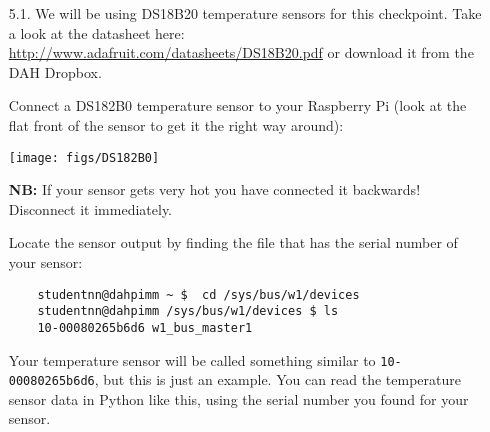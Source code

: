 \begin{enumerate}

\item [5.1.] We will be using DS18B20 temperature sensors for this checkpoint.
Take a look at the datasheet here: \url{http://www.adafruit.com/datasheets/DS18B20.pdf} or download it from the DAH Dropbox.

Connect a DS182B0 temperature sensor to your Raspberry Pi (look at the flat front of the sensor to get it the right way around):
\begin{center}
    \texttt{[image: figs/DS182B0]}
\end{center}
{\bf NB:} If your sensor gets very hot you have connected it backwards! Disconnect it immediately.


%

Locate the sensor output by finding the file that has the serial number of your sensor:
\begin{verbatim} 
    studentnn@dahpimm ~ $  cd /sys/bus/w1/devices 
    studentnn@dahpimm /sys/bus/w1/devices $ ls 
    10-00080265b6d6 w1_bus_master1 
\end{verbatim}



Your temperature sensor will be called something similar to \texttt{10-00080265b6d6}, but this is just an example.
You can read the temperature sensor data in Python like this, using the serial number you found for your sensor.



\end{enumerate}
